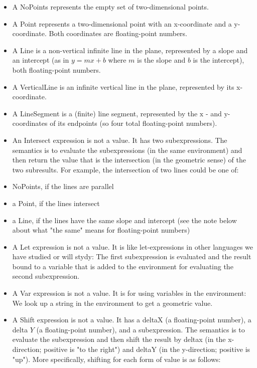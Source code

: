 \documentclass[a4paper,12pt]{article}
\begin{document}
\begin{itemize}
  \item A \textrm{NoPoints} represents the empty set of two-dimensional points.
  \item A \textrm{Point} represents a two-dimensional point with an x-coordinate and a y-coordinate. Both coordinates are floating-point numbers.
  \item A \textrm{Line} is a non-vertical infinite line in the plane, represented by a slope and an intercept (as in $y=m x+b$ where $m$ is the slope and $b$ is the intercept), both floating-point numbers.
  \item A \textrm{VerticalLine} is an infinite vertical line in the plane, represented by its x-coordinate.
  \item A \textrm{LineSegment} is a (finite) line segment, represented by the $\mathrm{x}$ - and $\mathrm{y}$-coordinates of its endpoints (so four total floating-point numbers).
  \item An \textrm{Intersect} expression is not a value. It has two subexpressions. The semantics is to evaluate the subexpressions (in the same environment) and then return the value that is the intersection (in the geometric sense) of the two subresults. For example, the intersection of two lines could be one of:
  \item \textrm{NoPoints}, if the lines are parallel
  \item a \textrm{Point}, if the lines intersect
  \item a \textrm{Line}, if the lines have the same slope and intercept (see the note below about what "the same" means for floating-point numbers)
  \item A \textrm{Let} expression is not a value. It is like let-expressions in other languages we have studied or will stydy: The first subexpression is evaluated and the result bound to a variable that is added to the environment for evaluating the second subexpression.
  \item A \textrm{Var} expression is not a value. It is for using variables in the environment: We look up a string in the environment to get a geometric value.
  \item A \textrm{Shift} expression is not a value. It has a deltaX (a floating-point number), a delta $Y$ (a floating-point number), and a subexpression. The semantics is to evaluate the subexpression and then shift the result by deltax (in the x-direction; positive is "to the right") and deltaY (in the y-direction; positive is "up"). More specifically, shifting for each form of value is as follows:

\end{itemize}
\end{document}
